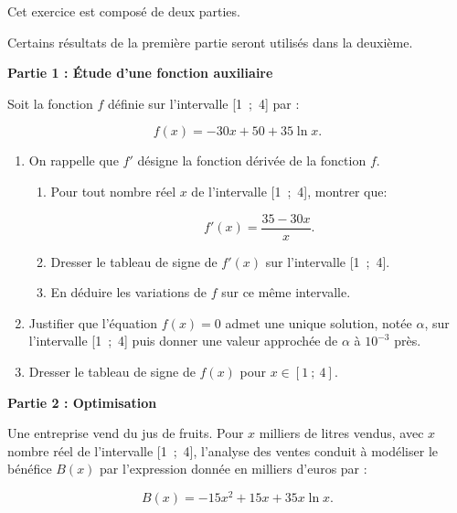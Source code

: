 \medskip


\medskip

Cet exercice est composé de deux parties.

\medskip

Certains résultats de la première partie seront utilisés dans la deuxième.

\medskip

\begin{center}\textbf{Partie 1 : Étude d'une fonction auxiliaire}\end{center}

Soit la fonction $f$ définie sur l'intervalle [1~;~4] par : 

\[f(x) = - 30x + 50 + 35\ln x.\]

\begin{enumerate}
\item On rappelle que $f'$ désigne la fonction dérivée de la fonction $f$.
	\begin{enumerate}
		\item Pour tout nombre réel $x$ de l'intervalle [1~;~4], montrer que: 
		
\[f'(x) = \dfrac{35- 30x}{x}.\]

		\item Dresser le tableau de signe de $f'(x)$ sur l'intervalle [1~;~4].
		\item En déduire les variations de $f$ sur ce même intervalle.
	\end{enumerate}
\item Justifier que l'équation $f(x) = 0$ admet une unique solution, notée $\alpha$, sur l'intervalle [1~;~4] puis donner une valeur approchée de $\alpha$ à $10^{-3}$ près.
\item  Dresser le tableau de signe de $f(x)$ pour $x \in [1~;~4]$.
\end{enumerate}

\bigskip

\textbf{Partie 2 : Optimisation}

\medskip

Une entreprise vend du jus de fruits. Pour $x$ milliers de litres vendus, avec $x$ nombre réel de l'intervalle [1~;~4], l'analyse des ventes conduit à modéliser le bénéfice $B(x)$ par l'expression donnée en milliers d'euros par :

\[B(x) = - 15x^2 + 15x +35x \ln x.\]

